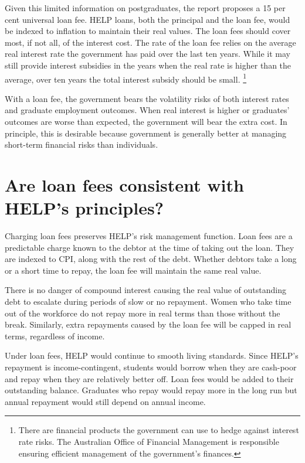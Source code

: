 \documentclass[embargoed]{grattan}
\begin{document}
Given this limited information on postgraduates, the report proposes a 15 per cent universal loan fee.
\gls{HELP} loans, both the principal and the loan fee, would be indexed to inflation to maintain their real values.
The loan fees should cover most, if not all, of the interest cost.
The rate of the loan fee relies on the average real interest rate the government has paid over the last ten years.
While it may still provide interest subsidies in the years when the real rate is higher than the average, over ten years the total interest subsidy should be small.%
\footnote{There are financial products the government can use to hedge against interest rate risks.
The Australian Office of Financial Management is responsible ensuring efficient management of the government's finances.}

With a loan fee, the government bears the volatility risks of both interest rates and graduate employment outcomes.
When real interest is higher or graduates' outcomes are worse than expected, the government will bear the extra cost.
In principle, this is desirable because government is generally better at managing short-term financial risks than individuals.

\section[Are loan fees consistent with {HELP}'s principles?]{Are loan fees consistent with \gls{HELP}'s principles?}\label{are-loan-fees-consistent-with-helps-principles}

Charging loan fees preserves \gls{HELP}'s risk management function.
Loan fees are a predictable charge known to the debtor at the time of taking out the loan.
They are indexed to \gls{CPI}, along with the rest of the debt.
Whether debtors take a long or a short time to repay, the loan fee will maintain the same real value.

There is no danger of compound interest causing the real value of outstanding debt to escalate during periods of slow or no repayment.
Women who take time out of the workforce do not repay more in real terms than those without the break.
Similarly, extra repayments caused by the loan fee will be capped in real terms, regardless of income.

Under loan fees, \gls{HELP} would continue to smooth living standards.
Since \gls{HELP}'s repayment is income-contingent, students would borrow when they are cash-poor and repay when they are relatively better off.
Loan fees would be added to their outstanding balance.
Graduates who repay would repay more in the long run but annual repayment would still depend on annual income.
\end{document}
